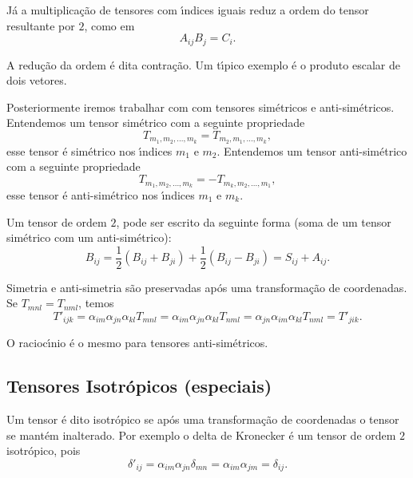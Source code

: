 J\'a a multiplica\c{c}\~ao de tensores com \'\i ndices iguais reduz
a ordem do tensor resultante por $2$, como em
\begin{equation}
A_{ij}B_{j}=C_{i}.
\end{equation}

A redu\c{c}\~ao da ordem \'e dita contra\c{c}\~ao. Um t\'\i pico
exemplo \'e o produto escalar de dois vetores.

Posteriormente iremos trabalhar com com tensores sim\'etricos e
anti-sim\'etricos. Entendemos um  tensor sim\'etrico com a seguinte
propriedade
\begin{equation}
T_{m_{1},m_{2},...,m_{k}}=T_{m_{2},m_{1},...,m_{k}},
\end{equation}
esse tensor \'e sim\'etrico nos \'\i ndices $m_{1}$ e
$m_{2}$. Entendemos um  tensor anti-sim\'etrico com a seguinte
propriedade
\begin{equation}
T_{m_{1},m_{2},...,m_{k}}=-T_{m_{k},m_{2},...,m_{1}},
\end{equation}
esse tensor \'e anti-sim\'etrico nos \'\i ndices $m_{1}$ e $m_{k}$.

Um tensor de
ordem $2$, pode ser escrito da seguinte forma (soma de um tensor
sim\'etrico com um anti-sim\'etrico):
\begin{equation}
B_{ij}=\frac{1}{2}(B_{ij}+B_{ji})+\frac{1}{2}(B_{ij}-B_{ji})=S_{ij}+A_{ij}.
\end{equation}

Simetria e anti-simetria s\~ao preservadas ap\'os uma
transforma\c{c}\~ao de coordenadas.
 Se $T_{mnl}=T_{nml}$, temos
\begin{equation}
T'_{ijk}=\alpha_{im}\alpha_{jn}\alpha_{kl}T_{mnl}=\alpha_{im}\alpha_{jn}\alpha_{kl}T_{nml}=
\alpha_{jn}\alpha_{im}\alpha_{kl}T_{nml}=T'_{jik}.
\end{equation}
 
O racioc\'\i nio \'e o mesmo para tensores anti-sim\'etricos.

\subsection{Tensores Isotr\'opicos (especiais)}


Um tensor \'e dito isotr\'opico se ap\'os uma transforma\c{c}\~ao
de coordenadas o tensor se mant\'em inalterado.
Por exemplo o delta de Kronecker \'e um tensor de ordem $2$
isotr\'opico, pois
\begin{equation}
\delta'_{ij}=\alpha_{im}\alpha_{jn}\delta_{mn}=\alpha_{im}\alpha_{jm}=\delta_{ij}.
\end{equation}

